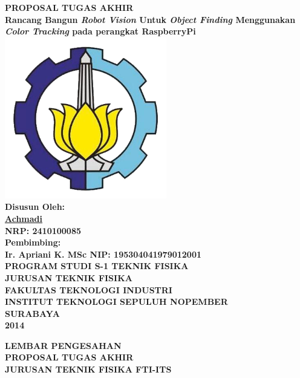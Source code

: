 \documentclass[a4paper,12pt]{article}
\title{}
\author{}
\date{}
\begin{document}
\begin{center}
  \textbf{ \Large{PROPOSAL TUGAS AKHIR } }\\[5pt]
  \textbf{ \large{Rancang Bangun \textit{Robot Vision} Untuk \textit{Object Finding} Menggunakan \textit{Color Tracking} pada perangkat RaspberryPi } }
  \\[50pt]
  \includegraphics[width=200pt]{ITS}
  \\[50pt]
  \textbf{ \large{Disusun Oleh:} }\\
  \underline{\textbf{ \large{Achmadi} } }\\
  \textbf{ \large{NRP: 2410100085 } }\\[40pt]
  \textbf{ \large{Pembimbing: } }\\
  \textbf{ \large{Ir. Apriani K. MSc \hspace{50pt} NIP: 195304041979012001} }\\[60pt]
  \textbf{ \large{PROGRAM STUDI S-1 TEKNIK FISIKA } }\\
  \textbf{ \large{JURUSAN TEKNIK FISIKA } }\\
  \textbf{ \large{FAKULTAS TEKNOLOGI INDUSTRI } }\\
  \textbf{ \large{INSTITUT TEKNOLOGI SEPULUH NOPEMBER } }\\
  \textbf{ \large{SURABAYA } }\\
  \textbf{ \large{2014 } }\\
\end{center}
\newpage
\begin{center}
  \textbf{ LEMBAR PENGESAHAN  }\\[5pt]
  \textbf{ PROPOSAL TUGAS AKHIR  } \\[5pt]
  \textbf{ JURUSAN TEKNIK FISIKA FTI-ITS  }\\[5pt]
\end{center}
\end{document}
